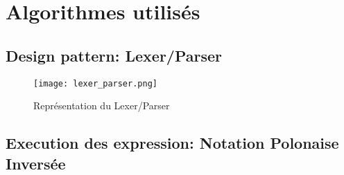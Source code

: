 \chapter{Algorithmes utilisés}
    \section{Design pattern: Lexer/Parser}
        \begin{figure}[h]
            \begin{center}
                \texttt{[image: lexer\_parser.png]}
            \end{center}

            \caption{Représentation du Lexer/Parser}
            \label{Représentation du Lexer/Parser}
        \end{figure}

        \lipsum[1-2]


    \section{Execution des expression: Notation Polonaise Inversée}
        \lipsum[1-2]